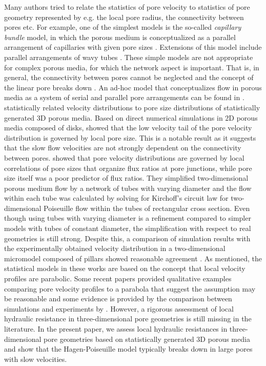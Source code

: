 \documentclass[draft]{agujournal2019}
\begin{document}
Many authors tried to relate the statistics of pore velocity to statistics of pore geometry represented by e.g. the local pore radius, the connectivity between pores etc. For example, one of the simplest models is the so-called \emph{capillary bundle} model, in which the porous medium is conceptualized as a parallel arrangement of capillaries with given pore sizes . Extensions of this model include parallel arrangements of wavy tubes . These simple models are not appropriate for complex porous media, for which the network aspect is important. That is, in general, the connectivity between pores cannot be neglected and the concept of the linear pore breaks down . An ad-hoc model that conceptualizes flow in porous media as a system of serial and parallel pore arrangements can be found in \cite{holzner_intermittent_2015}. \cite{siena_relationship_2014} statistically related velocity distributions to pore size distributions of statistically generated 3D porous media. Based on direct numerical simulations in 2D porous media composed of disks, \cite{de_anna_prediction_2017} showed that the low velocity tail of the pore velocity distribution is governed by local pore size. This is a notable result as it suggests that the slow flow velocities are not strongly dependent on the connectivity between pores. \cite{alim_local_2017} showed that pore velocity distributions are governed by local correlations of pore sizes that organize flux ratios at pore junctions, while pore size itself was a poor predictor of flux ratios. They simplified two-dimensional porous medium flow by a network of tubes with varying diameter and the flow within each tube was calculated by solving for Kirchoff’s circuit law for two-dimensional Poiseuille flow within the tubes of rectangular cross section. Even though using tubes with varying diameter is a refinement compared to simpler models with tubes of constant diameter, the simplification with respect to real geometries is still strong. Despite this, a comparison of simulation results with the experimentally obtained velocity distribution in a two-dimensional micromodel composed of pillars showed reasonable agreement . As mentioned, the statistical models in these works are based on the concept that local velocity profiles are parabolic. Some recent papers provided qualitative examples comparing pore velocity profiles to a parabola that suggest the assumption may be reasonable  and some evidence is provided by the comparison between simulations and experiments by \cite{alim_local_2017}. However, a rigorous assessment of local hydraulic resistance in three-dimensional pore geometries is still missing in the literature. In the present paper, we assess local hydraulic resistances in three-dimensional pore geometries based on statistically generated 3D porous media and show that the Hagen-Poiseuille model typically breaks down in large pores with slow velocities.
\end{document}
